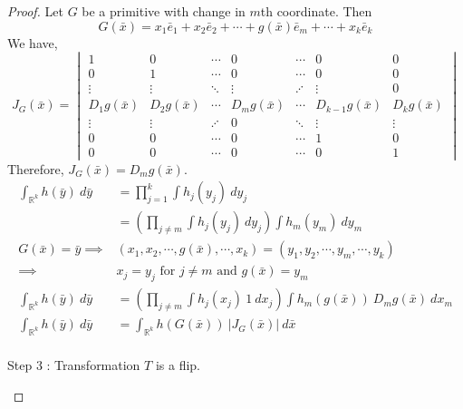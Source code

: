\begin{proof}
	Let $G$ be a primitive with change in $m$th coordinate.
	Then
	\begin{equation}
		G(\bar{x}) = x_1\bar{e}_1 + x_2\bar{e}_2 + \cdots + g(\bar{x})\bar{e}_m + \cdots + x_k\bar{e}_k
	\end{equation}
	We have,
	\begin{equation}
		J_G(\bar{x}) = \begin{vmatrix}
			1 & 0 & \cdots & 0 & \cdots & 0 & 0 \\
			0 & 1 & \cdots & 0 & \cdots & 0 & 0 \\
			\vdots & \vdots & \ddots & \vdots & \iddots & \vdots & 0 \\ 
			D_1g(\bar{x}) & D_2g(\bar{x}) & \cdots & D_mg(\bar{x}) & \cdots & D_{k-1}g(\bar{x}) & D_kg(\bar{x}) \\
			\vdots & \vdots & \iddots & 0 & \ddots & \vdots & \vdots \\
			0 & 0 & \cdots & 0 & \cdots & 1 & 0 \\
			0 & 0 & \cdots & 0 & \cdots & 0 & 1 
		\end{vmatrix}
	\end{equation}
	Therefore, $J_G(\bar{x}) = D_mg(\bar{x})$.
	\begin{align*}
		\int_{\mathbb{R}^k} h(\bar{y})\ d\bar{y} & = \prod_{j = 1}^k \int h_j(y_j)\ dy_j\\
		& = \left( \prod_{j \ne m} \int h_j(y_j)\ dy_j \right) \int h_m(y_m)\ dy_m \\
		G(\bar{x}) = \bar{y} \implies & (x_1,x_2,\cdots,g(\bar{x}),\cdots,x_k) = (y_1,y_2,\cdots,y_m,\cdots,y_k)\\
		\implies & x_j = y_j \text{ for } j \ne m \text{ and } g(\bar{x}) = y_m\\
		\int_{\mathbb{R}^k} h(\bar{y})\ d\bar{y} & = \left( \prod_{j \ne m} \int h_j(x_j)\ 1\ dx_j \right) \int h_m(g(\bar{x}))\ D_mg(\bar{x})\ dx_m \\
		\int_{\mathbb{R}^k} h(\bar{y})\ d\bar{y} & = \int_{\mathbb{R}^k} h(G(\bar{x}))\ |J_G(\bar{x})|\ d\bar{x}\\
	\end{align*}
	\begin{commentary}
		Step 3 : Transformation $T$ is a flip.
	\end{commentary}


\end{proof}
